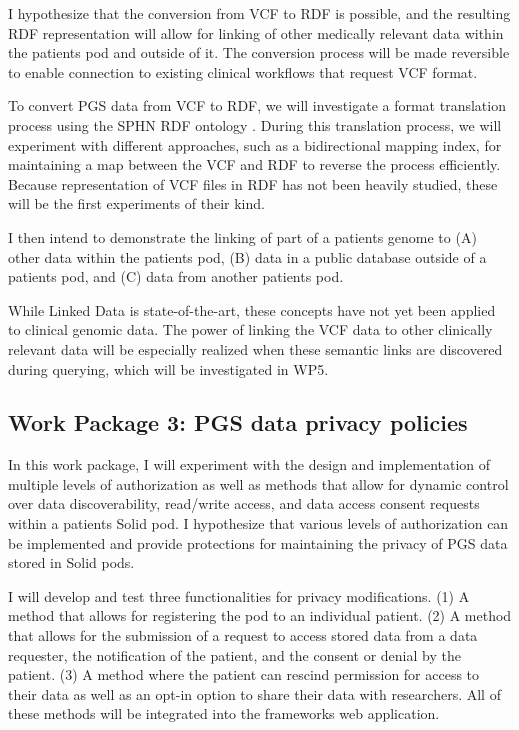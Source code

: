 \documentclass[runningheads]{llncs}
\begin{document}
I hypothesize that the conversion from VCF to RDF is possible, and the resulting RDF representation will allow for linking of other medically relevant data within the patient\textquotesingle s pod and outside of it.
The conversion process will be made reversible to enable connection to existing clinical workflows that request VCF format. 

To convert PGS data from VCF to RDF, we will investigate a format translation process using the SPHN RDF ontology \cite{van_der_horst_bridging_2023}. 
During this translation process, we will experiment with different approaches, such as a bidirectional mapping index, for maintaining a map between the VCF and RDF to reverse the process efficiently. 
Because representation of VCF files in RDF has not been heavily studied, these will be the first experiments of their kind.

I then intend to demonstrate the linking of part of a patient\textquotesingle s genome to
(A) other data within the patient\textquotesingle s pod, 
(B) data in a public database outside of a patient\textquotesingle s pod, and
(C) data from another patient\textquotesingle s pod.

While Linked Data is state-of-the-art, these concepts have not yet been applied to clinical genomic data.
The power of linking the VCF data to other clinically relevant data will be especially realized when these semantic links are discovered during querying, which will be investigated in WP5. 


\subsection{Work Package 3: PGS data privacy policies}

In this work package, I will experiment with the design and implementation of multiple levels of authorization as well as methods that allow for dynamic control over data discoverability, read/write access, and data access consent requests within a patient\textquotesingle s Solid pod. 
I hypothesize that various levels of authorization can be implemented and provide protections for maintaining the privacy of PGS data stored in Solid pods.

I will develop and test three functionalities for privacy modifications.
(1) A method that allows for registering the pod to an individual patient.
(2) A method that allows for the submission of a request to access stored data from a data requester, the notification of the patient, and the consent or denial by the patient.
(3) A method where the patient can rescind permission for access to their data as well as an opt-in option to share their data with researchers. 
All of these methods will be integrated into the framework\textquotesingle s web application.
\end{document}
